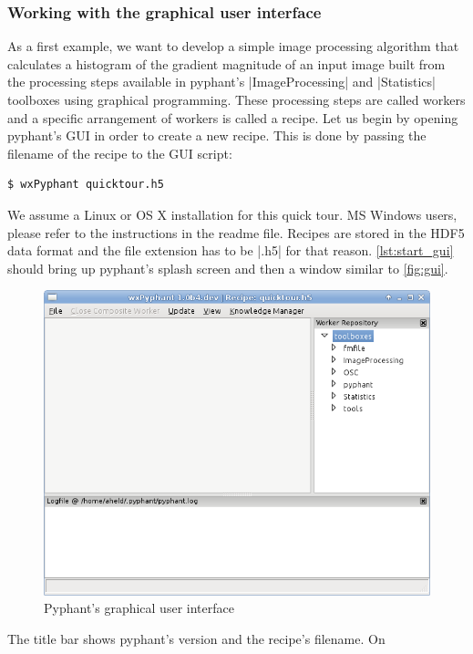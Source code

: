 \documentclass[a4paper]{article}
\begin{document}
\subsubsection{Working with the graphical user interface}
\label{sec:introduction_gui}

As a first example, we want to develop a simple image processing
algorithm that calculates a histogram of the gradient magnitude of an
input image built from the processing steps available in pyphant's
|ImageProcessing| and |Statistics| toolboxes using graphical
programming. These processing steps are called workers and a specific
arrangement of workers is called a recipe. Let us begin by opening
pyphant's GUI in order to create a new recipe. This is done by passing
the filename of the recipe to the GUI script:
\begin{lstlisting}[style=terminal,label={lst:start_gui},caption={Invoking
the GUI}]
$ wxPyphant quicktour.h5
\end{lstlisting}
We assume a Linux or OS X installation for this quick tour. MS Windows
users, please refer to the instructions in the readme
file\cite{wingui}. Recipes are stored in the HDF5\cite{hdf5} data
format and the file extension has to be |.h5| for that
reason. \autoref{lst:start_gui} should bring up pyphant's splash
screen and then a window similar to \autoref{fig:gui}.
\begin{figure}[h]
  \centering
  \includegraphics[scale=0.75]{fig/gui.png}
  \caption{Pyphant's graphical user interface}
  \label{fig:gui}
\end{figure}
The title bar shows pyphant's version and the recipe's filename. On
\end{document}
